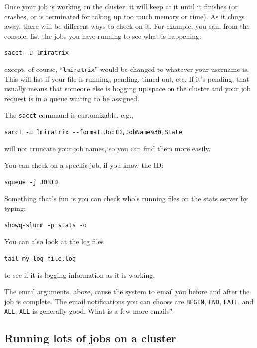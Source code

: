 \documentclass[
]{book}
\begin{document}
Once your job is working on the cluster, it will keep at it until it finishes (or crashes, or is terminated for taking up too much memory or time).
As it chugs away, there will be different ways to check on it.
For example, you can, from the console, list the jobs you have running to see what is happening:

\begin{verbatim}
sacct -u lmiratrix
\end{verbatim}

except, of course, ``\texttt{lmiratrix}'' would be changed to whatever your username is.
This will list if your file is running, pending, timed out, etc. If it's pending, that usually means that someone else is hogging up space on the cluster and your job request is in a queue waiting to be assigned.

The \texttt{sacct} command is customizable, e.g.,

\begin{verbatim}
sacct -u lmiratrix --format=JobID,JobName%30,State
\end{verbatim}

will not truncate your job names, so you can find them more easily.

You can check on a specific job, if you know the ID:

\begin{verbatim}
squeue -j JOBID
\end{verbatim}

Something that's fun is you can check who's running files on the stats server by typing:

\begin{verbatim}
showq-slurm -p stats -o
\end{verbatim}

You can also look at the log files

\begin{verbatim}
tail my_log_file.log
\end{verbatim}

to see if it is logging information as it is working.

The email arguments, above, cause the system to email you before and after the job is complete.
The email notifications you can choose are \texttt{BEGIN}, \texttt{END}, \texttt{FAIL}, and \texttt{ALL}; \texttt{ALL} is generally good. What is a few more emails?

\subsection{Running lots of jobs on a cluster}\label{running-lots-of-jobs-on-a-cluster}
\end{document}
